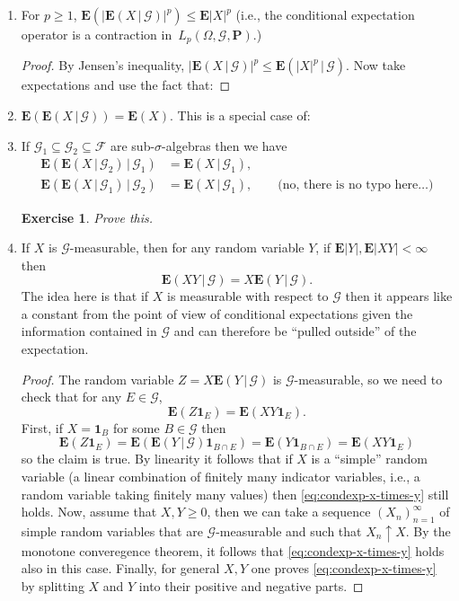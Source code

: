\documentclass[12pt]{article}
\newtheorem{exercise}[thm]{Exercise}
\newcommand{\prob}{\mathbf{P}}
\newcommand{\expec}{\mathbf{E}}
\newcommand{\condexp}[2]{\expec\left(#1\,|\,#2\right)}
\newcommand{\ind}{\textbf{1}}
\theoremstyle{example}
\begin{document}
\begin{enumerate}
\item For $p\ge 1$, $\expec\left( \left|\condexp{X}{\mathcal{G}}\right|^p \right) \le \expec|X|^p$ (i.e., the conditional expectation operator is a contraction in~$L_p(\Omega,\mathcal{G},\prob)$.)

\begin{proof}
By Jensen's inequality, $|\condexp{X}{\mathcal{G}}|^p \le \condexp{|X|^p}{\mathcal{G}}$. Now take expectations and use the fact that:
\end{proof}

\item $\expec(\condexp{X}{\mathcal{G}}) = \expec(X)$. This is a special case of:

\item If $\mathcal{G}_1\subseteq \mathcal{G}_2 \subseteq \mathcal{F}$ are sub-$\sigma$-algebras then we have
\begin{align*}
\condexp{\condexp{X}{\mathcal{G}_2}}{\mathcal{G}_1} &= \condexp{X}{\mathcal{G}_1}, \\
\condexp{\condexp{X}{\mathcal{G}_1}}{\mathcal{G}_2} &= \condexp{X}{\mathcal{G}_1},
\qquad  \textrm{(no, there is no typo here\ldots)}
\end{align*}


\begin{exercise} Prove this. \end{exercise}

\item If $X$ is $\mathcal{G}$-measurable, then for any random variable $Y$, if $\expec|Y|, \expec|XY|<\infty$ then
$$ \condexp{XY}{\mathcal{G}} = X \condexp{Y}{\mathcal{G}}.$$
The idea here is that if $X$ is measurable with respect to $\mathcal{G}$ then it appears like a constant from the point of view of conditional expectations given the information contained in $\mathcal{G}$ and can therefore be ``pulled outside'' of the expectation.

\begin{proof}
The random variable $Z=X\condexp{Y}{\mathcal{G}}$ is $\mathcal{G}$-measurable, so we need to check that for any $E\in \mathcal{G}$, 
\begin{equation}\label{eq:condexp-x-times-y}
\expec(Z\ind_E) = \expec(XY \ind_E).
\end{equation}
First, if $X=\ind_B$ for some $B\in\mathcal{G}$ then
$$ \expec(Z \ind_E) = \expec(\condexp{Y}{\mathcal{G}}\ind_{B\cap E}) = \expec(Y\ind_{B\cap E})
= \expec(XY \ind_E)
$$
so the claim is true. By linearity it follows that if $X$ is a ``simple'' random variable (a linear combination of finitely many indicator variables, i.e., a random variable taking finitely many values) then \eqref{eq:condexp-x-times-y} still holds. Now, assume that $X,Y\ge 0$, then we can take a sequence $(X_n)_{n=1}^\infty$ of simple random variables that are $\mathcal{G}$-measurable and such that $X_n\uparrow X$. By the monotone converegence theorem, it follows that \eqref{eq:condexp-x-times-y} holds also in this case. Finally, for general $X,Y$ one proves \eqref{eq:condexp-x-times-y} by splitting $X$ and $Y$ into their positive and negative parts.
\end{proof}


\end{enumerate}
\end{document}
